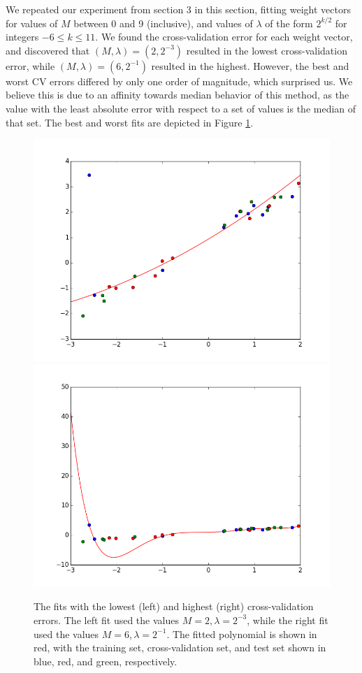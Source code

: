 \documentclass{article}
\begin{document}
We repeated our experiment from section 3 in this section, fitting weight vectors for values of $M$ between 0 and 9 (inclusive), and values of $\lambda$ of the form $2^{k/2}$ for integers $-6 \le k \le 11$. We found the cross-validation error for each weight vector, and discovered that $(M, \lambda) = (2, 2^{-3})$ resulted in the lowest cross-validation error, while $(M, \lambda) = (6, 2^{-1})$ resulted in the highest. However, the best and worst CV errors differed by only one order of magnitude, which surprised us. We believe this is due to an affinity towards median behavior of this method, as the value with the least absolute error with respect to a set of values is the median of that set. The best and worst fits are depicted in Figure \ref{p4figure}.

\begin{figure}
\label{p4figure}
\includegraphics[scale=0.4]{figure4_3.png}
\includegraphics[scale=0.4]{figure4_4.png}
\caption{The fits with the lowest (left) and highest (right) cross-validation errors. The left fit used the values $M=2, \lambda = 2^{-3}$, while the right fit used the values $M=6, \lambda = 2^{-1}$. The fitted polynomial is shown in red, with the training set, cross-validation set, and test set shown in blue, red, and green, respectively.}
\end{figure}
\end{document}
